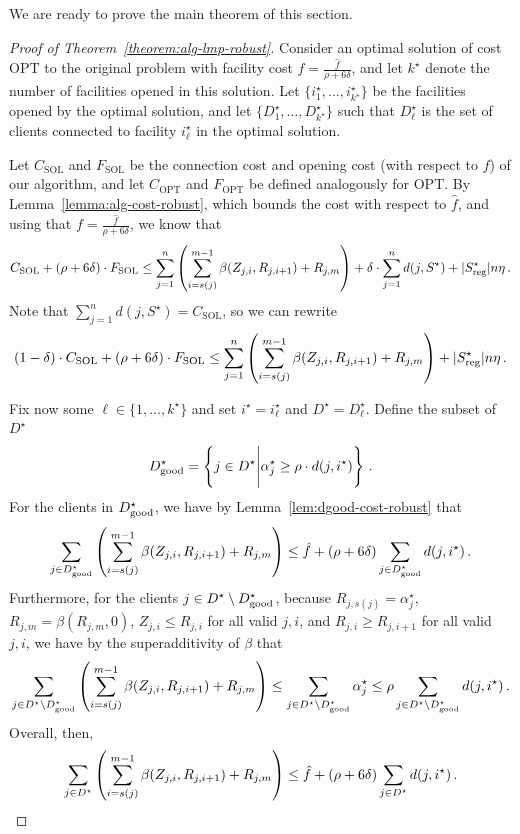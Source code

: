 We are ready to prove the main theorem of this section.

\begin{proof}[Proof of Theorem~\ref{theorem:alg-lmp-robust}]
    Consider an optimal solution of cost $\mathrm{OPT}$ to the original problem with facility cost $f = \frac{\hat{f}}{\rho + 6 \delta}$, and let $k^\star$ denote the number of facilities opened in this solution.
    Let $\{i_1^\star, \ldots, i_{k^\star}^\star\}$ be the facilities opened by the optimal solution, and let $\{D_1^\star, \ldots, D_{k^\star}^\star\}$ such that $D_\ell^\star$ is the set of clients connected to facility $i_\ell^\star$ in the optimal solution.
    
    Let $C_{\mathrm{SOL}}$ and $F_{\mathrm{SOL}}$ be the connection cost and opening cost (with respect to $f$) of our algorithm, and let $C_{\mathrm{OPT}}$ and $F_{\mathrm{OPT}}$ be defined analogously for $\mathrm{OPT}$.
    By Lemma~\ref{lemma:alg-cost-robust}, which bounds the cost with respect to $\hat{f}$, and using that $f = \frac{\hat{f}}{\rho+6\delta}$, we know that 
    \[C_{\mathrm{SOL}} + (\rho + 6 \delta) \cdot F_{\mathrm{SOL}} \leq \sum_{j=1}^n \left(\sum_{i=s(j)}^{m-1} \beta(Z_{j,i}, R_{j,i+1}) + R_{j, m}\right) + \delta \cdot \sum_{j=1}^n d(j,S^\star) + |S_{\mathrm{reg}}^\star| n \eta\,.\]
    Note that $\sum_{j=1}^n d(j, S^\star) = C_{\mathrm{SOL}}$, so we can rewrite
    \[(1-\delta) \cdot C_{\mathrm{SOL}} + (\rho + 6 \delta) \cdot F_{\mathrm{SOL}} \leq \sum_{j=1}^n \left(\sum_{i=s(j)}^{m-1} \beta(Z_{j,i}, R_{j,i+1}) + R_{j, m}\right) + |S_{\mathrm{reg}}^\star| n \eta\,.\]

    Fix now some $\ell \in \{1, \ldots, k^\star\}$ and set $i^\star = i^\star_\ell$ and $D^\star = D^\star_{\ell}$.
    Define the subset of $D^\star$
    \[D^\star_{\mathrm{good}} = \left\{j \in D^\star \Bigg| \alpha^\star_j \geq \rho \cdot d(j, i^\star)\right\}\,.\]
    For the clients in $D^\star_{\mathrm{good}}$, we have by Lemma~\ref{lem:dgood-cost-robust} that
    \[\sum_{j \in D^\star_{\mathrm{good}}} \left(\sum_{i=s(j)}^{m-1} \beta(Z_{j,i}, R_{j,i+1}) + R_{j, m}\right) \leq \hat{f} + (\rho+6\delta) \sum_{j \in D^\star_{\mathrm{good}}} d(j, i^\star)\,.\]
    Furthermore, for the clients $j \in D^\star \setminus D^\star_{\mathrm{good}}$, because $R_{j,s(j)} = \alpha_j^\star$, $R_{j,m} = \beta(R_{j,m}, 0)$, $Z_{j,i} \leq R_{j,i}$ for all valid $j,i$, and $R_{j,i} \geq R_{j,i+1}$ for all valid $j,i$, we have by the superadditivity of $\beta$ that
    \[\sum_{j \in D^\star \setminus D^\star_{\mathrm{good}}} \left(\sum_{i=s(j)}^{m-1} \beta(Z_{j,i}, R_{j,i+1}) + R_{j, m}\right) \leq \sum_{j \in D^\star \setminus D^\star_{\mathrm{good}}} \alpha^\star_j \leq \rho \sum_{j \in D^\star \setminus D^\star_{\mathrm{good}}} d(j, i^\star)\,.\]
    Overall, then,
    \[\sum_{j \in D^\star} \left(\sum_{i=s(j)}^{m-1} \beta(Z_{j,i}, R_{j,i+1}) + R_{j, m}\right) \leq \hat{f} + (\rho + 6 \delta) \sum_{j \in D^\star} d(j, i^\star)\,.\]
    

\end{proof}
